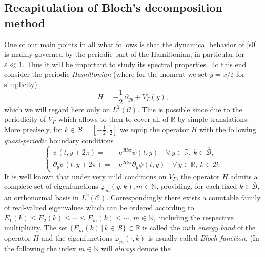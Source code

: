 \documentclass[leqno,final]{siamltex}
\numberwithin{equation}{section}
\newcounter{me}
\begin{document}
\subsection{Recapitulation of Bloch's decomposition method}\label{bloch}

One of our main points in all what follows is that the dynamical
behavior of \eqref{s0} is mainly governed by the periodic part of
the Hamiltonian, in particular for ${{\varepsilon }} \ll 1$. Thus it will be
important to study its spectral properties. To this end consider
the periodic \emph{Hamiltonian} (where for the moment we set $y =
x/ {{\varepsilon }} $ for simplicity) \begin{equation}\label{Hap} H=  -{\frac{{1}}{{2}}}\,
{\partial}_{yy}+V_{\Gamma}\left(y \right), \end{equation} which we will regard here only
on $L^2(\mathcal C)$. This is possible since due to the
periodicity of $V_\Gamma$ which allows to then to cover all of
${{\mathbb R}}$ by simple translations. More precisely, for $k \in
\overline{{\mathcal B}}=\left[-{\frac{{1}}{{2}}},{\frac{{1}}{{2}}}\right]$ we equip
the operator $H$ with the following \emph{quasi-periodic} boundary
conditions \begin{equation}\label{perpsi1} \left\{
\begin{aligned}
\psi(t,y+2\pi)= & \, {\mathrm{e}}^{ 2 {\mathrm{i}} k\pi}\psi(t,y) \quad {\forall} \, y\in {{\mathbb R}},
\ k \in \overline{\mathcal B},\\
{\partial}_y\psi(t,y+2\pi)= & \, {\mathrm{e}}^{2 {\mathrm{i}} k\pi}{\partial}_y\psi(t,y) \quad {\forall} \,
y\in {{\mathbb R}},\ k\in \overline{\mathcal B}.
\end{aligned}
\right. \end{equation} It is well known \cite{Wi} that under very mild
conditions on $V_\Gamma$, the operator $H$ admits a complete set
of eigenfunctions ${\varphi}_m(y,k), m\in {{\mathbb N }}$, providing, for each fixed
$k \in \overline{{\mathcal B}}$, an orthonormal basis in
$L^2(\mathcal C)$. Correspondingly there exists a countable family
of real-valued eigenvalues which can be ordered according to
$E_1(k)\le E_2(k)\leq \cdots \le E_m(k)\le \cdots$, $ m\in {{\mathbb N }},$
including the respective multiplicity. The set $\label{Em}
\{E_m(k)\,|\, k\in \mathcal B\}\subset {{\mathbb R}}$ is called the $m$th
\emph{energy band} of the operator $H$ and the eigenfunctions
${\varphi}_m(\cdot,k)$ is usually called \emph{Bloch function}. (In the
following the index $m \in {{\mathbb N }}$ will \emph{always} denote the
\end{document}
